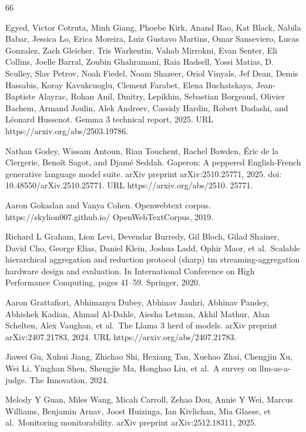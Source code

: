 \documentclass[
  10
]{article}
\begin{document}
66

Egyed, Victor Cotruta, Minh Giang, Phoebe Kirk, Anand Rao, Kat Black,
Nabila Babar, Jessica Lo, Erica Moreira, Luiz Gustavo Martins, Omar
Sanseviero, Lucas Gonzalez, Zach Gleicher, Tris Warkentin, Vahab
Mirrokni, Evan Senter, Eli Collins, Joelle Barral, Zoubin Ghahramani,
Raia Hadsell, Yossi Matias, D. Sculley, Slav Petrov, Noah Fiedel, Noam
Shazeer, Oriol Vinyals, Jef Dean, Demis Hassabis, Koray Kavukcuoglu,
Clement Farabet, Elena Buchatskaya, Jean-Baptiste Alayrac, Rohan Anil,
Dmitry, Lepikhin, Sebastian Borgeaud, Olivier Bachem, Armand Joulin,
Alek Andreev, Cassidy Hardin, Robert Dadashi, and Léonard Hussenot.
Gemma 3 technical report, 2025. URL https://arxiv.org/abs/2503.19786.

Nathan Godey, Wissam Antoun, Rian Touchent, Rachel Bawden, Éric de la
Clergerie, Benoît Sagot, and Djamé Seddah. Gaperon: A peppered
English-French generative language model suite. arXiv preprint
arXiv:2510.25771, 2025. doi: 10.48550/arXiv.2510.25771. URL
https://arxiv.org/abs/2510. 25771.

Aaron Gokaslan and Vanya Cohen. Openwebtext corpus.
https://skylion007.github.io/ OpenWebTextCorpus, 2019.

Richard L Graham, Lion Levi, Devendar Burredy, Gil Bloch, Gilad Shainer,
David Cho, George Elias, Daniel Klein, Joshua Ladd, Ophir Maor, et
al.~Scalable hierarchical aggregation and reduction protocol (sharp) tm
streaming-aggregation hardware design and evaluation. In International
Conference on High Performance Computing, pages 41--59. Springer, 2020.

Aaron Grattafiori, Abhimanyu Dubey, Abhinav Jauhri, Abhinav Pandey,
Abhishek Kadian, Ahmad Al-Dahle, Aiesha Letman, Akhil Mathur, Alan
Schelten, Alex Vaughan, et al.~The Llama 3 herd of models. arXiv
preprint arXiv:2407.21783, 2024. URL https://arxiv.org/abs/2407.21783.

Jiawei Gu, Xuhui Jiang, Zhichao Shi, Hexiang Tan, Xuehao Zhai, Chengjin
Xu, Wei Li, Yinghan Shen, Shengjie Ma, Honghao Liu, et al.~A survey on
llm-as-a-judge. The Innovation, 2024.

Melody Y Guan, Miles Wang, Micah Carroll, Zehao Dou, Annie Y Wei, Marcus
Williams, Benjamin Arnav, Joost Huizinga, Ian Kivlichan, Mia Glaese, et
al.~Monitoring monitorability. arXiv preprint arXiv:2512.18311, 2025.
\end{document}

